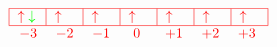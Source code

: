 \[
    \textcolor{red}{
        \begin{array}{c}
            \begin{tabular}{|m{0.5cm}|m{0.5cm}|m{0.5cm}|m{0.5cm}|m{0.5cm}|m{0.5cm}|m{0.5cm}|}
                \hline
                $\uparrow \textcolor{green}{\downarrow}$ & $\uparrow$ & $\uparrow$ & $\uparrow$ & $\uparrow$ & $\uparrow$ & $\uparrow$ \\
                \hline
            \end{tabular} \\ 
            \begin{tabular}{m{0.5cm} m{0.5cm} m{0.5cm} m{0.5cm} m{0.5cm} m{0.5cm} m{0.5cm}}
                $-3$ & $-2$ & $-1$ & \text{ 0 } & $+1$ & $+2$ & $+3$
            \end{tabular}
        \end{array}
    }
\]